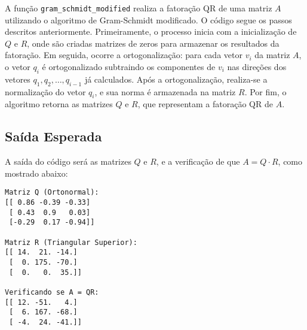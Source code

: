 A função \texttt{gram\_schmidt\_modified} realiza a fatoração QR de uma matriz \( A \) utilizando o algoritmo de Gram-Schmidt modificado. O código segue os passos descritos anteriormente. Primeiramente, o processo inicia com a inicialização de \( Q \) e \( R \), onde são criadas matrizes de zeros para armazenar os resultados da fatoração. Em seguida, ocorre a ortogonalização: para cada vetor \( v_i \) da matriz \( A \), o vetor \( q_i \) é ortogonalizado subtraindo os componentes de \( v_i \) nas direções dos vetores \( q_1, q_2, \dots, q_{i-1} \) já calculados. Após a ortogonalização, realiza-se a normalização do vetor \( q_i \), e sua norma é armazenada na matriz \( R \). Por fim, o algoritmo retorna as matrizes \( Q \) e \( R \), que representam a fatoração QR de \( A \).


\subsection{Saída Esperada}

A saída do código será as matrizes \( Q \) e \( R \), e a verificação de que \( A = Q \cdot R \), como mostrado abaixo:
\begin{lstlisting}
Matriz Q (Ortonormal):
[[ 0.86 -0.39 -0.33]
 [ 0.43  0.9   0.03]
 [-0.29  0.17 -0.94]]

Matriz R (Triangular Superior):
[[ 14.  21. -14.]
 [  0. 175. -70.]
 [  0.   0.  35.]]

Verificando se A = QR:
[[ 12. -51.   4.]
 [  6. 167. -68.]
 [ -4.  24. -41.]]
\end{lstlisting}


